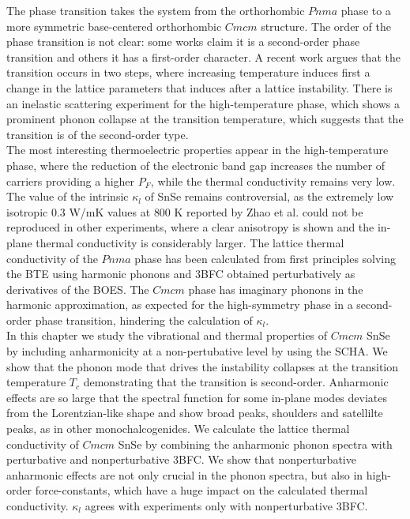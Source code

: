 The phase transition takes the system from the orthorhombic $Pnma$ phase to a more symmetric base-centered orthorhombic $Cmcm$ structure. The order of the phase transition is not clear: some works\cite{zhao2014ultralow,
adouby1998structure,chattopadhyay1986neutron,chatterji2018soft} claim it is a second-order phase transition and others\cite{von1981high} it has a first-order character. A recent work\cite{dewandre2016two} argues that the transition occurs in 
two steps, where increasing temperature induces first a change in the lattice parameters that induces after a lattice instability. There is an inelastic scattering experiment for the high-temperature phase, which shows a prominent phonon collapse at the transition temperature, which suggests that the transition is of the second-order type\cite{chatterji2018soft}. \\

The most interesting thermoelectric properties appear in the high-temperature phase, where the reduction of the electronic band gap increases the number of carriers providing a higher $P_{F}$, while the thermal conductivity 
remains very low. The value of the intrinsic $\kappa_{l}$ of SnSe remains controversial, as the extremely low isotropic $0.3$ W/mK values at $800$ K reported by Zhao et al.\cite{zhao2014ultralow} could not be reproduced in 
other experiments, where a clear anisotropy is shown and the in-plane thermal conductivity is considerably larger\cite{ibrahim2017reinvestigation,sassi2014assessment,chen2014thermoelectric}. The lattice thermal conductivity 
of the $Pnma$ phase has been calculated\cite{carrete2014low,skelton2016anharmonicity} from first principles solving the BTE using harmonic phonons and 3BFC obtained perturbatively as derivatives of the BOES. The $Cmcm$ phase 
has imaginary phonons in the harmonic approximation\cite{dewandre2016two,skelton2016anharmonicity,yu2016enhanced}, as expected for the high-symmetry phase in a second-order phase transition, hindering the 
calculation of $\kappa_{l}$. \\

In this chapter we study the vibrational and thermal properties of $Cmcm$ SnSe by including anharmonicity at a non-pertubative level by using the SCHA. We show that the phonon mode that drives the instability collapses at the 
transition temperature $T_{c}$ demonstrating that the transition is second-order. Anharmonic effects are so large that the spectral function for some in-plane modes deviates from the Lorentzian-like shape and show broad peaks, 
shoulders and satellilte peaks, as in other monochalcogenides\cite{ribeiro2018strong,li2014phonon}. We calculate the lattice thermal conductivity of $Cmcm$ SnSe by combining the anharmonic phonon spectra with perturbative and 
nonperturbative 3BFC. We show that nonperturbative anharmonic effects are not only crucial in the phonon spectra, but also in high-order force-constants, which have a huge impact on the calculated thermal conductivity. 
$\kappa_{l}$ agrees with experiments\cite{ibrahim2017reinvestigation} only with nonperturbative 3BFC.

